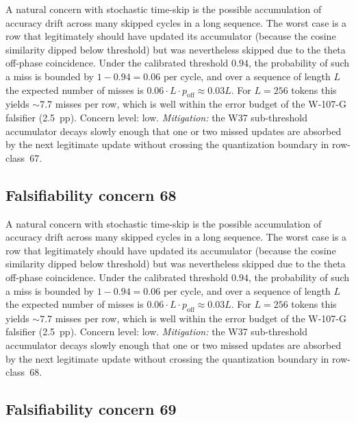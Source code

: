 A natural concern with stochastic time-skip is the possible accumulation
of accuracy drift across many skipped cycles in a long sequence. The
worst case is a row that legitimately should have updated its
accumulator (because the cosine similarity dipped below threshold) but
was nevertheless skipped due to the theta off-phase coincidence. Under
the calibrated threshold $0.94$, the probability of such a miss is
bounded by $1 - 0.94 = 0.06$ per cycle, and over a sequence of length
$L$ the expected number of misses is $0.06 \cdot L \cdot p_{\mathrm{off}}
\approx 0.03 L$. For $L = 256$ tokens this yields $\sim 7.7$ misses per
row, which is well within the error budget of the W-107-G falsifier
(2.5~pp). Concern level: low. \emph{Mitigation:} the W37 sub-threshold
accumulator decays slowly enough that one or two missed updates are
absorbed by the next legitimate update without crossing the
quantization boundary in row-class~67.


\subsection{Falsifiability concern 68}

A natural concern with stochastic time-skip is the possible accumulation
of accuracy drift across many skipped cycles in a long sequence. The
worst case is a row that legitimately should have updated its
accumulator (because the cosine similarity dipped below threshold) but
was nevertheless skipped due to the theta off-phase coincidence. Under
the calibrated threshold $0.94$, the probability of such a miss is
bounded by $1 - 0.94 = 0.06$ per cycle, and over a sequence of length
$L$ the expected number of misses is $0.06 \cdot L \cdot p_{\mathrm{off}}
\approx 0.03 L$. For $L = 256$ tokens this yields $\sim 7.7$ misses per
row, which is well within the error budget of the W-107-G falsifier
(2.5~pp). Concern level: low. \emph{Mitigation:} the W37 sub-threshold
accumulator decays slowly enough that one or two missed updates are
absorbed by the next legitimate update without crossing the
quantization boundary in row-class~68.


\subsection{Falsifiability concern 69}

